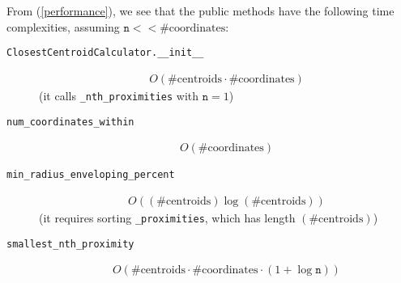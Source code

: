 \documentclass{amsart}
\theoremstyle{definition}
\theoremstyle{definition}
\begin{document}
From (\ref{performance}), we see that the public methods have the following time complexities, assuming $\texttt{n} << \#\mbox{coordinates}$:
\begin{description}
\item[\texttt{ClosestCentroidCalculator.\_\_init\_\_}]
  \begin{align*}
    O(\#\mbox{centroids} \cdot \#\mbox{coordinates})
  \end{align*} (it calls \texttt{\_nth\_proximities} with $\texttt{n}=1$)
\item[\texttt{num\_coordinates\_within}]
  \begin{align*}O(\#\mbox{coordinates})\end{align*}
\item[\texttt{min\_radius\_enveloping\_percent}] \begin{align*}O((\#\mbox{centroids}) \log(\#\mbox{centroids}))\end{align*}
  (it requires sorting \texttt{\_proximities}, which has length $(\#\mbox{centroids})$)
\item[\texttt{smallest\_nth\_proximity}]
  \begin{align*}O(\#\mbox{centroids} \cdot \#\mbox{coordinates}\cdot (1+\log \texttt{n}))\end{align*}
\end{description}
\end{document}
